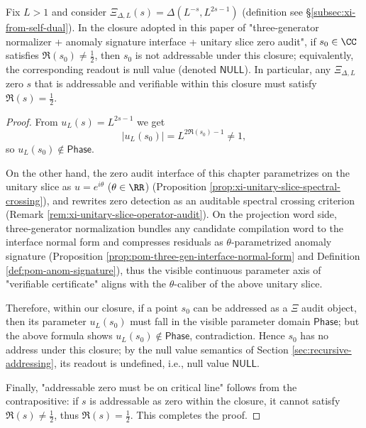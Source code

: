 \begin{theorem}\label{thm:xi-offset-null-type-safety}
Fix \(L>1\) and consider \(\Xi_{\Delta,L}(s)=\Delta(L^{-s},L^{2s-1})\) (definition see \S\ref{subsec:xi-from-self-dual}).
In the closure adopted in this paper of "three-generator normalizer + anomaly signature interface + unitary slice zero audit", if \(s_0\in\CC\) satisfies \(\Re(s_0)\neq \tfrac12\), then \(s_0\) is not addressable under this closure; equivalently, the corresponding readout is null value (denoted \(\mathsf{NULL}\)).
In particular, any \(\Xi_{\Delta,L}\) zero \(s\) that is addressable and verifiable within this closure must satisfy \(\Re(s)=\tfrac12\).
\end{theorem}

\begin{proof}
From \(u_L(s)=L^{2s-1}\) we get
\[
|u_L(s_0)|=L^{2\Re(s_0)-1}\neq 1,
\]
so \(u_L(s_0)\notin\mathsf{Phase}\).
\par
On the other hand, the zero audit interface of this chapter parametrizes on the unitary slice as \(u=e^{i\theta}\) (\(\theta\in\RR\)) (Proposition \ref{prop:xi-unitary-slice-spectral-crossing}), and rewrites zero detection as an auditable spectral crossing criterion (Remark \ref{rem:xi-unitary-slice-operator-audit}).
On the projection word side, three-generator normalization bundles any candidate compilation word to the interface normal form and compresses residuals as \(\theta\)-parametrized anomaly signature (Proposition \ref{prop:pom-three-gen-interface-normal-form} and Definition \ref{def:pom-anom-signature}), thus the visible continuous parameter axis of "verifiable certificate" aligns with the \(\theta\)-caliber of the above unitary slice.
\par
Therefore, within our closure, if a point \(s_0\) can be addressed as a \(\Xi\) audit object, then its parameter \(u_L(s_0)\) must fall in the visible parameter domain \(\mathsf{Phase}\); but the above formula shows \(u_L(s_0)\notin\mathsf{Phase}\), contradiction.
Hence \(s_0\) has no address under this closure; by the null value semantics of Section \ref{sec:recursive-addressing}, its readout is undefined, i.e., null value \(\mathsf{NULL}\).
\par
Finally, "addressable zero must be on critical line" follows from the contrapositive: if \(s\) is addressable as zero within the closure, it cannot satisfy \(\Re(s)\neq\tfrac12\), thus \(\Re(s)=\tfrac12\). This completes the proof.
\end{proof}

